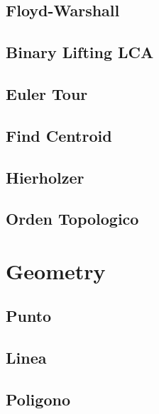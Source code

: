\subsection{Floyd-Warshall}
\raggedbottom
\hrulefill
\subsection{Binary Lifting LCA}
\raggedbottom
\hrulefill
\subsection{Euler Tour}
\raggedbottom
\hrulefill
\subsection{Find Centroid}
\raggedbottom
\hrulefill
\subsection{Hierholzer}
\raggedbottom
\hrulefill
\subsection{Orden Topologico}
\raggedbottom
\hrulefill
\newpage

\section{Geometry}
\subsection{Punto}
\raggedbottom
\hrulefill
\subsection{Linea}
\raggedbottom
\hrulefill
\subsection{Poligono}
\raggedbottom
\hrulefill

